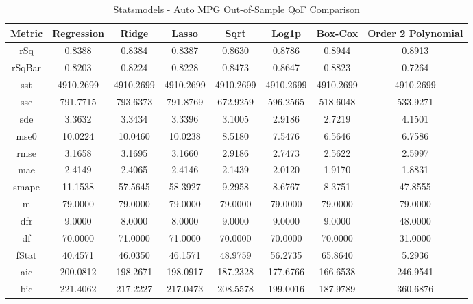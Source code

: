 \documentclass{article}
\begin{document}
\begin{table}[H]
\centering
\caption{Statsmodels - Auto MPG Out-of-Sample QoF Comparison}
\label{tab:Statsmodels - Auto MPG Out-of-Sample QoF Comparison}
\begin{tabular}{|c|c|c|c|c|c|c|c|}\hline
Metric & Regression & Ridge & Lasso & Sqrt & Log1p & Box-Cox & Order 2 Polynomial \\ \hline \hline
rSq & 0.8388 & 0.8384 & 0.8387 & 0.8630 & 0.8786 & 0.8944 & 0.8913 \\ \hline
rSqBar & 0.8203 & 0.8224 & 0.8228 & 0.8473 & 0.8647 & 0.8823 & 0.7264 \\ \hline
sst & 4910.2699 & 4910.2699 & 4910.2699 & 4910.2699 & 4910.2699 & 4910.2699 & 4910.2699 \\ \hline
sse & 791.7715 & 793.6373 & 791.8769 & 672.9259 & 596.2565 & 518.6048 & 533.9271 \\ \hline
sde & 3.3632 & 3.3434 & 3.3396 & 3.1005 & 2.9186 & 2.7219 & 4.1501 \\ \hline
mse0 & 10.0224 & 10.0460 & 10.0238 & 8.5180 & 7.5476 & 6.5646 & 6.7586 \\ \hline
rmse & 3.1658 & 3.1695 & 3.1660 & 2.9186 & 2.7473 & 2.5622 & 2.5997 \\ \hline
mae & 2.4149 & 2.4065 & 2.4146 & 2.1439 & 2.0120 & 1.9170 & 1.8831 \\ \hline
smape & 11.1538 & 57.5645 & 58.3927 & 9.2958 & 8.6767 & 8.3751 & 47.8555 \\ \hline
m & 79.0000 & 79.0000 & 79.0000 & 79.0000 & 79.0000 & 79.0000 & 79.0000 \\ \hline
dfr & 9.0000 & 8.0000 & 8.0000 & 9.0000 & 9.0000 & 9.0000 & 48.0000 \\ \hline
df & 70.0000 & 71.0000 & 71.0000 & 70.0000 & 70.0000 & 70.0000 & 31.0000 \\ \hline
fStat & 40.4571 & 46.0350 & 46.1571 & 48.9759 & 56.2735 & 65.8640 & 5.2936 \\ \hline
aic & 200.0812 & 198.2671 & 198.0917 & 187.2328 & 177.6766 & 166.6538 & 246.9541 \\ \hline
bic & 221.4062 & 217.2227 & 217.0473 & 208.5578 & 199.0016 & 187.9789 & 360.6876 \\ \hline
\end{tabular}
\end{table}
\end{document}
